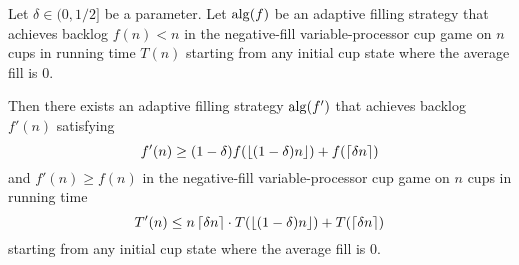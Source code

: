 \begin{lemma}\label{lem:adaptiveAmplification}
  Let $\delta\in(0,1/2]$ be a parameter.
  Let $\operatorname{\text{\textup{alg}}}(f)$ be an adaptive filling strategy that 
  achieves backlog $f(n) < n$ in the negative-fill variable-processor cup game
  on $n$ cups in running time $T(n)$ starting from any initial
  cup state where the average fill is $0$.

  Then there exists an adaptive filling strategy $\operatorname{\text{\textup{alg}}}(f')$ that
  achieves backlog $f'(n)$ satisfying 
  $$f'(n) \ge (1-\delta)f(\left\lfloor (1-\delta)n \right\rfloor) + f(\left\lceil \delta n \right\rceil) $$
  and $f'(n) \ge f(n)$
  in the negative-fill variable-processor cup game on $n$ cups in running time 
  $$T'(n) \le n\left\lceil \delta n \right\rceil \cdot T(\left\lfloor (1-\delta)n \right\rfloor) + T(\left\lceil \delta n \right\rceil)$$
  starting from any initial cup state where the average fill is $0$.
\end{lemma}
